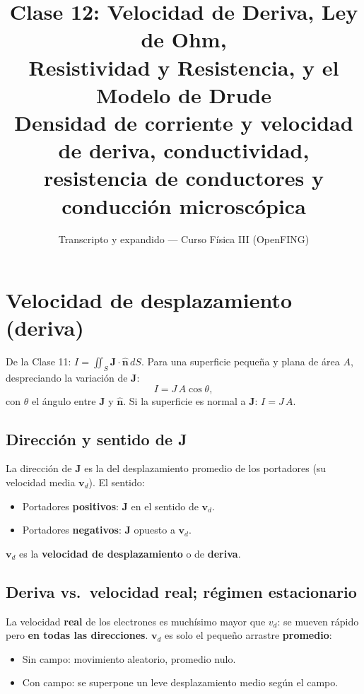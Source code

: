 \documentclass[12pt,a4paper]{article}
\title{\textbf{Clase 12: Velocidad de Deriva, Ley de Ohm, \\
        Resistividad y Resistencia, y el Modelo de Drude}\\[0.3em]
        \large{Densidad de corriente y velocidad de deriva, conductividad,
              resistencia de conductores y conducción microscópica}}
\author{Transcripto y expandido --- Curso Física III (OpenFING)}
\date{}
\begin{document}
\maketitle
\thispagestyle{empty}
\newpage

\tableofcontents
\newpage

\section{Velocidad de desplazamiento (deriva)}

De la Clase 11: $I = \iint_S \mathbf{J}\cdot\hat{\mathbf{n}}\,dS$. Para una
superficie pequeña y plana de área $A$, despreciando la variación de
$\mathbf{J}$:
\[
I = J\,A\cos\theta,
\]
con $\theta$ el ángulo entre $\mathbf{J}$ y $\hat{\mathbf{n}}$. Si la
superficie es normal a $\mathbf{J}$: $I = J\,A$.

\subsection{Dirección y sentido de J}

La dirección de $\mathbf{J}$ es la del desplazamiento promedio de los
portadores (su velocidad media $\mathbf{v}_d$). El sentido:
\begin{itemize}[nosep]
  \item Portadores \textbf{positivos}: $\mathbf{J}$ en el sentido de
        $\mathbf{v}_d$.
  \item Portadores \textbf{negativos}: $\mathbf{J}$ opuesto a
        $\mathbf{v}_d$.
\end{itemize}
$\mathbf{v}_d$ es la \textbf{velocidad de desplazamiento} o de
\textbf{deriva}.

\subsection{Deriva vs.\ velocidad real; régimen estacionario}

La velocidad \textbf{real} de los electrones es muchísimo mayor que
$v_d$: se mueven rápido pero \textbf{en todas las direcciones}.
$\mathbf{v}_d$ es solo el pequeño arrastre \textbf{promedio}:
\begin{itemize}[nosep]
  \item Sin campo: movimiento aleatorio, promedio nulo.
  \item Con campo: se superpone un leve desplazamiento medio según el
        campo.
\end{itemize}
\end{document}
